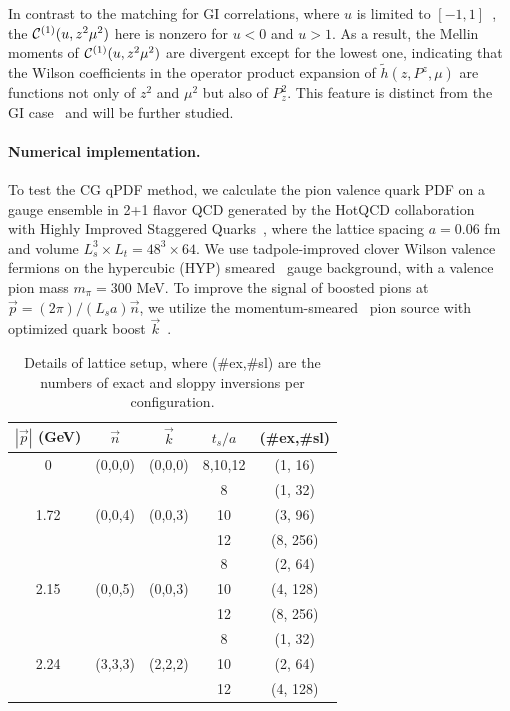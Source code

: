 \documentclass[prd,twocolumn,preprintnumbers,showpacs,nofootinbib,superscriptaddress,notitlepage,floatfix]{revtex4-1}
\begin{document}
In contrast to the matching for GI correlations, where $u$ is limited to $[-1,1]$~\cite{Radyushkin:2017cyf,Ji:2017rah}, the ${\cal C}^{(1)}(u,z^2\mu^2)$ here is nonzero for $u<0$ and $u>1$. As a result, the Mellin moments of ${\cal C}^{(1)}(u,z^2\mu^2)$ are divergent except for the lowest one, indicating that the Wilson coefficients in the operator product expansion of $\tilde h(z,P^z,\mu)$ are functions not only of $z^2$ and $\mu^2$ but also of $P_z^2$. This feature is distinct from the GI case~\cite{Izubuchi:2018srq} and will be further studied.

\paragraph*{Numerical implementation.}
To test the CG qPDF method, we calculate the pion valence quark PDF on a gauge ensemble in 2+1 flavor QCD 
generated by the HotQCD collaboration~\cite{HotQCD:2014kol} with
Highly Improved Staggered Quarks~\cite{Follana:2006rc}, where the lattice spacing $a=0.06$ fm and volume $L_s^3\times L_t=48^3 \times 64$. We use tadpole-improved clover Wilson valence fermions 
on the hypercubic (HYP) smeared~\cite{Hasenfratz:2001hp} gauge background, with a valence pion mass $m_\pi=300$ MeV. To improve the signal of boosted pions at $\vec{p}=(2\pi)/(L_sa)\vec{n}$, we utilize the momentum-smeared~\cite{Bali:2016lva} pion source with optimized quark boost $\vec{k}$~\cite{Izubuchi:2019lyk,Gao:2020ito}.

\begin{table}
\centering
\begin{tabular}{c|c|c|c|c}
\hline
\hline
$|\vec{p}|$ (GeV)&$\vec{n}$ & $\vec{k}$ & $t_s/a$ & (\#ex,\#sl) \\
\hline
 0   &(0,0,0) & (0,0,0) & 8,10,12 & (1, 16) \\
\hline
     && & 8       & (1, 32) \\
 1.72&(0,0,4) & (0,0,3) & 10      & (3, 96) \\
     && & 12      & (8, 256) \\
\hline
     && & 8       & (2, 64) \\
 2.15&(0,0,5) & (0,0,3) & 10      & (4, 128) \\
     && & 12      & (8, 256) \\
 \hline
     & &  & 8       & (1, 32) \\
 2.24&(3,3,3) & (2,2,2) & 10      & (2, 64) \\
     && & 12      & (4, 128) \\
\hline
\hline
\end{tabular}
\caption{Details of lattice setup, where (\#ex,\#sl) are the numbers of exact and sloppy inversions per configuration.}
\label{tbl:setup}
\end{table}
\end{document}

